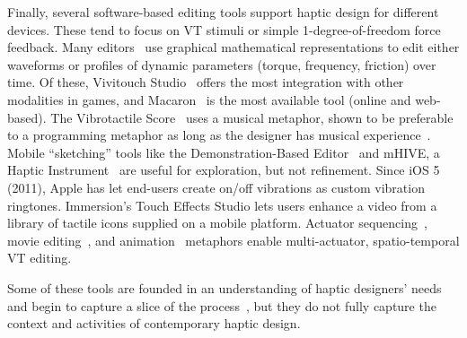 Finally, several software-based editing tools support haptic design for different devices.
These tend to focus on VT stimuli or simple 1-degree-of-freedom force feedback.
Many editors~\citep{Enriquez2003,Swindells2006,Ryu2008,Swindells2014,Meyer2016,Schneider2016macaron}
use graphical mathematical representations to edit either waveforms or profiles of dynamic parameters (torque, frequency, friction) over time.
Of these, Vivitouch Studio~\citep{Swindells2014} offers the most integration with other modalities in games, and Macaron~\citep{Schneider2016macaron} is the most available tool (online and web-based). %
The Vibrotactile Score~\citep{Lee2009} uses a musical metaphor, shown to be preferable to a programming metaphor as long as the designer has musical experience~\citep{Lee2012}. 
Mobile ``sketching'' tools like the Demonstration-Based Editor~\citep{Hong2013} and
mHIVE, a Haptic Instrument~\citep{Schneider2014} are useful for exploration, but not refinement.
Since iOS 5 (2011), Apple has let end-users create on/off vibrations as custom vibration ringtones.
Immersion's Touch Effects Studio lets users enhance a video from a library of tactile icons supplied on a mobile platform.
Actuator sequencing~\citep{Paneels2013}, movie editing~\citep{Kim2009}, and animation~\citep{Schneider2015} metaphors enable multi-actuator, spatio-temporal VT editing.

Some of these tools are founded in an understanding of haptic designers' needs \citep{Schneider2015,Swindells2014} and begin to capture a slice of the \haxd process~\citep{Schneider2016macaron}, but they do not fully capture the context and activities of contemporary haptic design.



